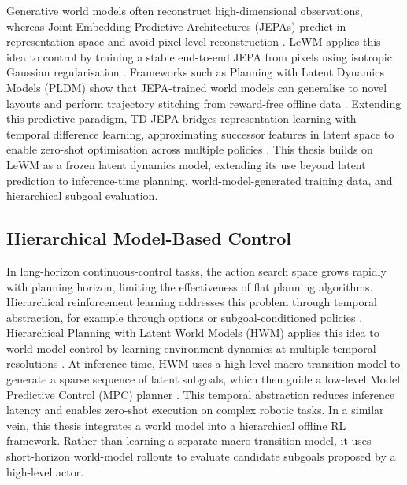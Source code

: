 Generative world models often reconstruct high-dimensional observations,
whereas Joint-Embedding Predictive Architectures (JEPAs) predict in
representation space and avoid pixel-level reconstruction
\cite{LeCun2022APT,assran2023selfsupervisedlearningimagesjointembedding}. LeWM applies this
idea to control by training a stable end-to-end JEPA from pixels using
isotropic Gaussian regularisation
\cite{maes2026leworldmodelstableendtoendjointembedding}. Frameworks
such as Planning with Latent Dynamics Models (PLDM) show that
JEPA-trained world models can generalise to novel layouts and perform
trajectory stitching from reward-free offline data
\cite{sobal2025learningrewardfreeofflinedata}. Extending this predictive
paradigm, TD-JEPA bridges representation learning with temporal
difference learning, approximating successor features in latent space to
enable zero-shot optimisation across multiple policies
\cite{bagatella2025tdjepalatentpredictiverepresentationszeroshot}.
This thesis builds on LeWM as a frozen latent dynamics model, extending
its use beyond latent prediction to inference-time planning,
world-model-generated training data, and hierarchical subgoal
evaluation.

\subsection{Hierarchical Model-Based Control}

In long-horizon continuous-control tasks, the action search space grows
rapidly with planning horizon, limiting the effectiveness of flat
planning algorithms. Hierarchical reinforcement learning addresses this
problem through temporal abstraction, for example through options or
subgoal-conditioned policies \cite{SUTTON1999181,nachum2018dataefficienthierarchicalreinforcementlearning,park2024hiqlofflinegoalconditionedrl}.
Hierarchical Planning with Latent World Models (HWM) applies this idea
to world-model control by learning environment dynamics at multiple
temporal resolutions \cite{zhang2026hierarchicalplanninglatentworld}.
At inference time, HWM uses a high-level macro-transition model to
generate a sparse sequence of latent subgoals, which then guide a
low-level Model Predictive Control (MPC) planner
\cite{zhang2026hierarchicalplanninglatentworld}. This temporal
abstraction reduces inference latency and enables zero-shot execution on
complex robotic tasks.
In a similar vein, this thesis integrates a world model into a
hierarchical offline RL framework. Rather than learning a separate
macro-transition model, it uses short-horizon world-model rollouts to
evaluate candidate subgoals proposed by a high-level actor.

